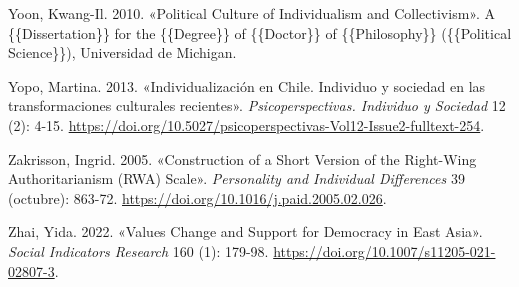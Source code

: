\documentclass[
  letterpaper,
  DIV=11,
  numbers=noendperiod]{scrartcl}
\newlength{\cslhangindent}
\newenvironment{CSLReferences}[2] %
 {\begin{list}{}{%
  \setlength{\itemindent}{0pt}
  \setlength{\leftmargin}{0pt}
  \setlength{\parsep}{0pt}
  \ifodd #1
   \setlength{\leftmargin}{\cslhangindent}
   \setlength{\itemindent}{-1\cslhangindent}
  \fi
  \setlength{\itemsep}{#2\baselineskip}}}
 {\end{list}}
\begin{document}
\begin{CSLReferences}{1}{0}
Yoon, Kwang-Il. 2010. {«Political {Culture} of {Individualism} and
{Collectivism}»}. A \{\{Dissertation\}\} for the \{\{Degree\}\} of
\{\{Doctor\}\} of \{\{Philosophy\}\} (\{\{Political Science\}\}),
Universidad de Michigan.

Yopo, Martina. 2013. {«{Individualizaci{ó}n en Chile. Individuo y
sociedad en las transformaciones culturales recientes}»}.
\emph{Psicoperspectivas. Individuo y Sociedad} 12 (2): 4-15.
\url{https://doi.org/10.5027/psicoperspectivas-Vol12-Issue2-fulltext-254}.

Zakrisson, Ingrid. 2005. {«Construction of a Short Version of the
{Right-Wing Authoritarianism} ({RWA}) {Scale}»}. \emph{Personality and
Individual Differences} 39 (octubre): 863-72.
\url{https://doi.org/10.1016/j.paid.2005.02.026}.

Zhai, Yida. 2022. {«Values {Change} and {Support} for {Democracy} in
{East Asia}»}. \emph{Social Indicators Research} 160 (1): 179-98.
\url{https://doi.org/10.1007/s11205-021-02807-3}.

\end{CSLReferences}
\end{document}
